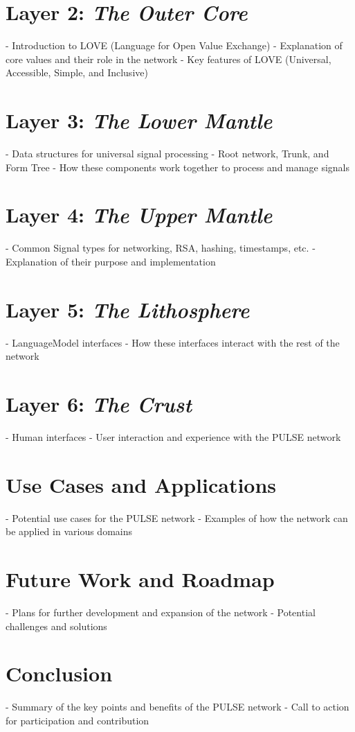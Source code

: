 \documentclass{article}
\begin{document}
\section{Layer 2: \textit{The Outer Core}}
- Introduction to LOVE (Language for Open Value Exchange)
- Explanation of core values and their role in the network
- Key features of LOVE (Universal, Accessible, Simple, and Inclusive)

\section{Layer 3: \textit{The Lower Mantle}}
- Data structures for universal signal processing
- Root network, Trunk, and Form Tree
- How these components work together to process and manage signals

\section{Layer 4: \textit{The Upper Mantle}}
- Common Signal types for networking, RSA, hashing, timestamps, etc.
- Explanation of their purpose and implementation

\section{Layer 5: \textit{The Lithosphere}}
- LanguageModel interfaces
- How these interfaces interact with the rest of the network

\section{Layer 6: \textit{The Crust}}
- Human interfaces
- User interaction and experience with the PULSE network

\section{Use Cases and Applications}
- Potential use cases for the PULSE network
- Examples of how the network can be applied in various domains

\section{Future Work and Roadmap}
- Plans for further development and expansion of the network
- Potential challenges and solutions

\section{Conclusion}
- Summary of the key points and benefits of the PULSE network
- Call to action for participation and contribution



\end{document}
